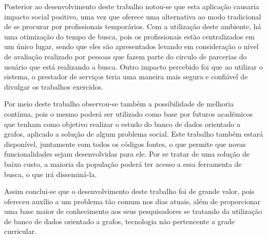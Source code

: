 \par Posterior ao desenvolvimento deste trabalho notou-se que esta aplicação causaria impacto social positivo, uma vez que oferece uma alternativa ao modo tradicional de se procurar por profissionais temporários. Com a utilização deste ambiente, há uma otimização do tempo de busca, pois os profissionais estão centralizados em um único lugar, sendo que eles são apresentados levando em consideração o nível de avaliação realizado por pessoas que fazem parte do circulo de parcerias do usuário que está realizando a busca. Outro impacto percebido foi que ao utilizar o sistema, o prestador de serviços teria uma maneira mais segura e confiável de divulgar os trabalhos exercidos.  

\par Por meio deste trabalho observou-se também a possibilidade de melhoria contínua, pois o mesmo poderá ser utilizado como base por futuros acadêmicos que tenham como objetivo realizar o estudo do banco de dados orientado a grafos, aplicado a solução de algum problema social. Este trabalho também estará disponível, juntamente com todos os códigos fontes, o que permite que novas funcionalidades sejam desenvolvidas para ele. Por se tratar de uma solução de baixo custo, a maioria da população poderá ter acesso a essa ferramenta de busca, o que irá disseminá-la.

\par Assim conclui-se que o desenvolvimento deste trabalho foi de grande valor, pois ofereceu auxílio a um problema tão comum nos dias atuais, além de proporcionar uma base maior de conhecimento aos seus pesquisadores se tratando da utilização de banco de dados orientado a grafos, tecnologia não pertencente a grade curricular.